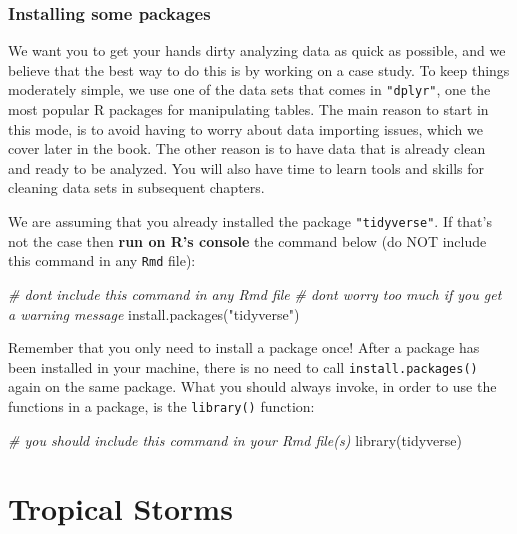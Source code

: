 \documentclass[
]{book}
\newenvironment{Shaded}{\begin{snugshade}}{\end{snugshade}}
\newcommand{\CommentTok}[1]{\textcolor[rgb]{0.56,0.35,0.01}{\textit{#1}}}
\newcommand{\FunctionTok}[1]{\textcolor[rgb]{0.00,0.00,0.00}{#1}}
\newcommand{\NormalTok}[1]{#1}
\newcommand{\StringTok}[1]{\textcolor[rgb]{0.31,0.60,0.02}{#1}}
\begin{document}
\hypertarget{installing-some-packages}{%
\subsection{Installing some packages}\label{installing-some-packages}}

We want you to get your hands dirty analyzing data as quick as possible, and
we believe that the best way to do this is by working on a case study. To keep
things moderately simple, we use one of the data sets that comes in \texttt{"dplyr"},
one the most popular R packages for manipulating tables. The main reason to
start in this mode, is to avoid having to worry about data importing issues,
which we cover later in the book. The other
reason is to have data that is already clean and ready to be analyzed.
You will also have time to learn tools and skills for cleaning data sets in
subsequent chapters.

We are assuming that you already installed the package \texttt{"tidyverse"}. If that's
not the case then \textbf{run on R's console} the command
below (do NOT include this command in any \texttt{Rmd} file):

\begin{Shaded}
\begin{Highlighting}[]
\CommentTok{\# don\textquotesingle{}t include this command in any Rmd file}
\CommentTok{\# don\textquotesingle{}t worry too much if you get a warning message}
\FunctionTok{install.packages}\NormalTok{(}\StringTok{"tidyverse"}\NormalTok{)}
\end{Highlighting}
\end{Shaded}

Remember that you only need to install a package once! After a package has been
installed in your machine, there is no need to call \texttt{install.packages()} again
on the same package. What you should always invoke, in order to use the
functions in a package, is the \texttt{library()} function:

\begin{Shaded}
\begin{Highlighting}[]
\CommentTok{\# you should include this command in your Rmd file(s)}
\FunctionTok{library}\NormalTok{(tidyverse)}
\end{Highlighting}
\end{Shaded}

\hypertarget{tropical-storms}{%
\chapter{Tropical Storms}\label{tropical-storms}}
\end{document}
